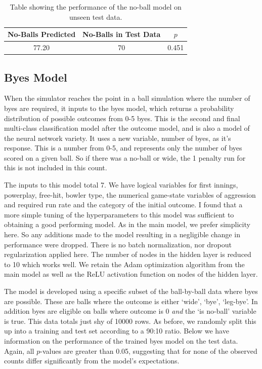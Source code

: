 \begin{table}[h]
\vspace{0.5em}
\centering
\begin{tabular} {c c c} \toprule
    {No-Balls Predicted} & {No-Balls in Test Data} & {$p$} \\ \midrule
     77.20 & 70 & 0.451 \\ \bottomrule
\end{tabular}
\caption{Table showing the performance of the no-ball model on unseen test data.}
\label{table: noball}
\end{table}

\subsection{Byes Model}

When the simulator reaches the point in a ball simulation where the number of byes are required, it inputs to the byes model, which returns a probability distribution of possible outcomes from 0-5 byes. This is the second and final multi-class classification model after the outcome model, and is also a model of the neural network variety. It uses a new variable, number of byes, as it's response. This is a number from 0-5, and represents only the number of byes scored on a given ball. So if there was a no-ball or wide, the 1 penalty run for this is not included in this count.

The inputs to this model total 7. We have logical variables for first innings, powerplay, free-hit, bowler type, the numerical game-state variables of aggression and required run rate and the category of the initial outcome. I found that a more simple tuning of the hyperparameters to this model was sufficient to obtaining a good performing model. As in the main model, we prefer simplicity here. So any additions made to the model resulting in a negligible change in performance were dropped. There is no batch normalization, nor dropout regularization applied here. The number of nodes in the hidden layer is reduced to 10 which works well. We retain the Adam optimization algorithm from the main model as well as the ReLU activation function on nodes of the hidden layer.

The model is developed using a specific subset of the ball-by-ball data where byes are possible. These are balls where the outcome is either `wide', `bye', `leg-bye'. In addition byes are eligible on balls where outcome is 0 \textit{and} the `is no-ball' variable is true. This data totals just shy of 10000 rows. As before, we randomly split this up into a training and test set according to a 90:10 ratio. Below we have information on the performance of the trained byes model on the test data. Again, all $p$-values are greater than 0.05, suggesting that for none of the observed counts differ significantly from the model's expectations.

